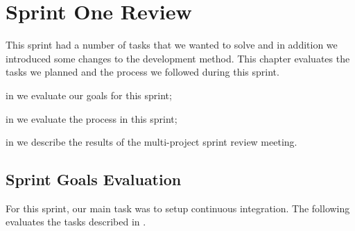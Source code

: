 \chapter{Sprint One Review}\label{chap:sprint1_end}
This sprint had a number of tasks that we wanted to solve and in addition we introduced some changes to the development method. This chapter evaluates the tasks we planned and the process we followed during this sprint.

\begin{chapterorganization}
  \item in  we evaluate our goals for this sprint;
  \item in  we evaluate the process in this sprint;
  \item in  we describe the results of the multi-project sprint review meeting.
\end{chapterorganization}

\section{Sprint Goals Evaluation}\label{sec:s1_goals}
For this sprint, our main task was to setup continuous integration. The following evaluates the tasks described in .

